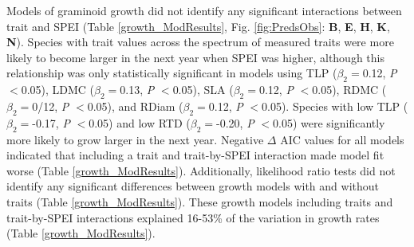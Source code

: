\documentclass[12pt, letterpaper]{article}
\begin{document}
Models of graminoid growth did not identify any significant interactions between trait and SPEI (Table \ref{growth_ModResults}, Fig. \ref{fig:PredsObs}: \textbf{B}, \textbf{E}, \textbf{H}, \textbf{K}, \textbf{N}). Species with trait values across the spectrum of measured traits were more likely to become larger in the next year when SPEI was higher, although this relationship was only statistically significant in models using TLP ($\beta _2=$0.12, \textit{P} $<$0.05), LDMC ($\beta _2=$0.13, \textit{P} $<$0.05), SLA ($\beta _2=$0.12, \textit{P} $<$0.05), RDMC ($\beta _2=$0/12, \textit{P} $<$0.05), and RDiam ($\beta _2=$0.12, \textit{P} $<$0.05). Species with low TLP ($\beta _2=$-0.17, \textit{P} $<$0.05) and low RTD ($\beta _2=$-0.20, \textit{P} $<$0.05) were significantly more likely to grow larger in the next year. Negative $\Delta$ AIC values for all models indicated that including a trait and trait-by-SPEI interaction made model fit worse (Table \ref{growth_ModResults}). Additionally, likelihood ratio tests did not identify any significant differences between growth models with and without traits (Table \ref{growth_ModResults}). These growth models including traits and trait-by-SPEI interactions explained 16-53\% of the variation in growth rates (Table \ref{growth_ModResults}). 
\end{document}
